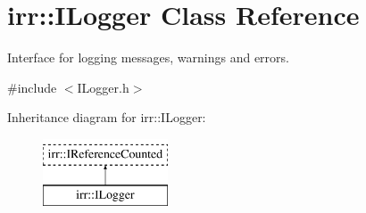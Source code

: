 \hypertarget{classirr_1_1ILogger}{}\section{irr\+:\+:I\+Logger Class Reference}
\label{classirr_1_1ILogger}


Interface for logging messages, warnings and errors.  




{\ttfamily \#include $<$I\+Logger.\+h$>$}

Inheritance diagram for irr\+:\+:I\+Logger\+:\begin{figure}[H]
\begin{center}
\leavevmode
\includegraphics[height=2.000000cm]{classirr_1_1ILogger}
\end{center}
\end{figure}

